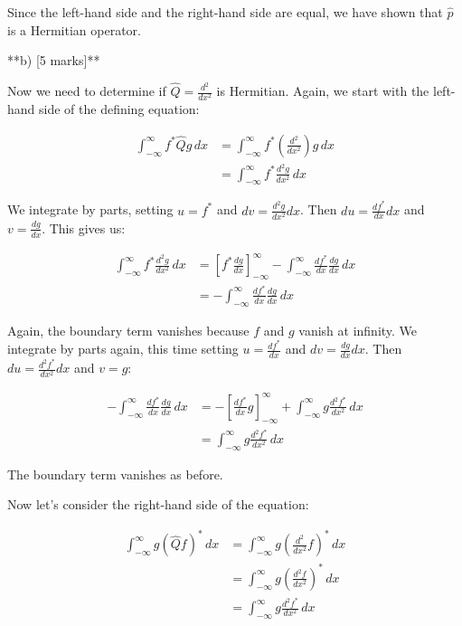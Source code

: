 \documentclass{article}
\begin{document}
Since the left-hand side and the right-hand side are equal, we have shown that $\hat{p}$ is a Hermitian operator.

**b) [5 marks]**

Now we need to determine if $\hat{Q} = \frac{d^2}{dx^2}$ is Hermitian.  Again, we start with the left-hand side of the defining equation:

\begin{align*}
\int_{-\infty}^{\infty} f^* \hat{Q} g \, dx &= \int_{-\infty}^{\infty} f^* \left( \frac{d^2}{dx^2} \right) g \, dx \\
&= \int_{-\infty}^{\infty} f^* \frac{d^2g}{dx^2} \, dx
\end{align*}

We integrate by parts, setting $u = f^*$ and $dv = \frac{d^2g}{dx^2} dx$.  Then $du = \frac{df^*}{dx} dx$ and $v = \frac{dg}{dx}$.  This gives us:

\begin{align*}
\int_{-\infty}^{\infty} f^* \frac{d^2g}{dx^2} \, dx &= \left[ f^* \frac{dg}{dx} \right]_{-\infty}^{\infty} - \int_{-\infty}^{\infty} \frac{df^*}{dx} \frac{dg}{dx} \, dx \\
&= - \int_{-\infty}^{\infty} \frac{df^*}{dx} \frac{dg}{dx} \, dx
\end{align*}

Again, the boundary term vanishes because $f$ and $g$ vanish at infinity. We integrate by parts again, this time setting $u = \frac{df^*}{dx}$ and $dv = \frac{dg}{dx} dx$.  Then $du = \frac{d^2f^*}{dx^2} dx$ and $v = g$:

\begin{align*}
- \int_{-\infty}^{\infty} \frac{df^*}{dx} \frac{dg}{dx} \, dx &= - \left[ \frac{df^*}{dx} g \right]_{-\infty}^{\infty} + \int_{-\infty}^{\infty} g \frac{d^2f^*}{dx^2} \, dx \\
&= \int_{-\infty}^{\infty} g \frac{d^2f^*}{dx^2} \, dx
\end{align*}

The boundary term vanishes as before.

Now let's consider the right-hand side of the equation:

\begin{align*}
\int_{-\infty}^{\infty} g (\hat{Q} f)^* \, dx &= \int_{-\infty}^{\infty} g \left( \frac{d^2}{dx^2} f \right)^* \, dx \\
&= \int_{-\infty}^{\infty} g \left( \frac{d^2f}{dx^2} \right)^* \, dx \\
&= \int_{-\infty}^{\infty} g \frac{d^2f^*}{dx^2} \, dx
\end{align*}
\end{document}
